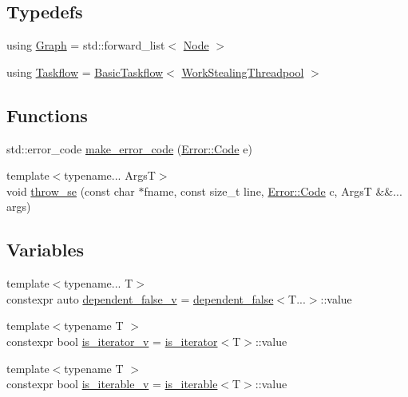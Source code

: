 \subsection*{Typedefs}
\begin{DoxyCompactItemize}
\item 
using \hyperlink{namespacetf_a2afa7da139285640eaf8122535136dc9}{Graph} = std\+::forward\+\_\+list$<$ \hyperlink{classtf_1_1Node}{Node} $>$
\item 
using \hyperlink{namespacetf_aa4b65604639a98fffa65678506be94c9}{Taskflow} = \hyperlink{classtf_1_1BasicTaskflow}{Basic\+Taskflow}$<$ \hyperlink{classtf_1_1WorkStealingThreadpool}{Work\+Stealing\+Threadpool} $>$
\end{DoxyCompactItemize}
\subsection*{Functions}
\begin{DoxyCompactItemize}
\item 
std\+::error\+\_\+code \hyperlink{namespacetf_aba49ed1abcd24ee88f72374c706c3b87}{make\+\_\+error\+\_\+code} (\hyperlink{structtf_1_1Error_aad6732b815bfe4ae3cea402042ee43a3}{Error\+::\+Code} e)
\item 
{\footnotesize template$<$typename... ArgsT$>$ }\\void \hyperlink{namespacetf_ab9d4e31acc93431725fa1affca09e823}{throw\+\_\+se} (const char $\ast$fname, const size\+\_\+t line, \hyperlink{structtf_1_1Error_aad6732b815bfe4ae3cea402042ee43a3}{Error\+::\+Code} c, ArgsT \&\&... args)
\end{DoxyCompactItemize}
\subsection*{Variables}
\begin{DoxyCompactItemize}
\item 
{\footnotesize template$<$typename... T$>$ }\\constexpr auto \hyperlink{namespacetf_ac47db20fe8976148fb7523a31a1039ce}{dependent\+\_\+false\+\_\+v} = \hyperlink{structtf_1_1dependent__false}{dependent\+\_\+false}$<$T...$>$\+::value
\item 
{\footnotesize template$<$typename T $>$ }\\constexpr bool \hyperlink{namespacetf_a7492bd7f91002715d38e477e86ec38c9}{is\+\_\+iterator\+\_\+v} = \hyperlink{structtf_1_1is__iterator}{is\+\_\+iterator}$<$T$>$\+::value
\item 
{\footnotesize template$<$typename T $>$ }\\constexpr bool \hyperlink{namespacetf_a19ce57208fa48a058ae54864d4b343f3}{is\+\_\+iterable\+\_\+v} = \hyperlink{structtf_1_1is__iterable}{is\+\_\+iterable}$<$T$>$\+::value
\end{DoxyCompactItemize}


